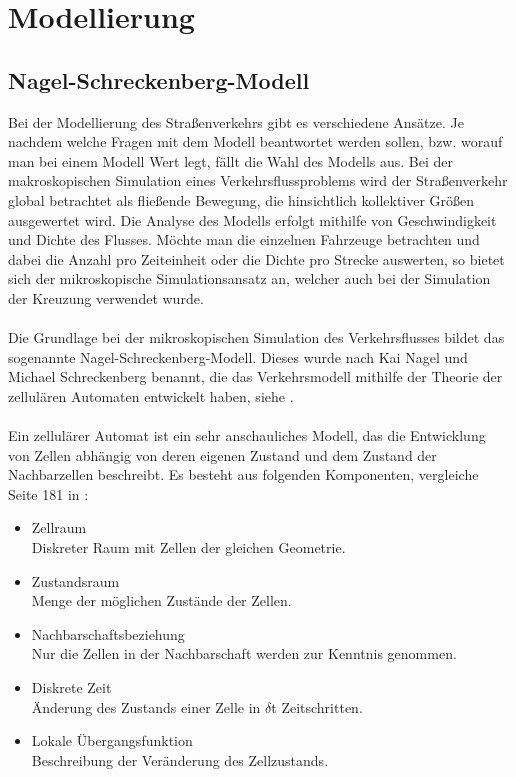 \chapter{Modellierung}\label{chap2}

\section{Nagel-Schreckenberg-Modell}
Bei der Modellierung des Straßenverkehrs gibt es verschiedene Ansätze. Je nachdem welche Fragen mit dem Modell beantwortet werden sollen, bzw. worauf man bei einem Modell Wert legt, fällt die Wahl des Modells aus. Bei der makroskopischen Simulation eines Verkehrsflussproblems wird der Straßenverkehr global betrachtet als fließende Bewegung, die hinsichtlich kollektiver Größen ausgewertet wird. Die Analyse des Modells erfolgt mithilfe von Geschwindigkeit und Dichte des Flusses. Möchte man die einzelnen Fahrzeuge betrachten und dabei die Anzahl pro Zeiteinheit oder die Dichte pro Strecke auswerten, so bietet sich der mikroskopische Simulationsansatz an, welcher auch bei der Simulation der Kreuzung verwendet wurde. \\
\\
Die Grundlage bei der mikroskopischen Simulation des Verkehrsflusses bildet das sogenannte Nagel-Schreckenberg-Modell. Dieses wurde nach Kai Nagel und Michael Schreckenberg benannt, die das Verkehrsmodell mithilfe der Theorie der zellulären Automaten entwickelt haben, siehe \cite{article:NaSch}. \\
\\
Ein zellulärer Automat ist ein sehr anschauliches Modell, das die Entwicklung von Zellen abhängig von deren eigenen Zustand und dem Zustand der Nachbarzellen beschreibt. Es besteht aus folgenden Komponenten, vergleiche Seite 181 in \cite{book:bungartz}: 
\begin{itemize}
 	  \item Zellraum\\
      		Diskreter Raum mit Zellen der gleichen Geometrie.
      \item Zustandsraum\\
      		Menge der möglichen Zustände der Zellen.
      \item Nachbarschaftsbeziehung\\
      		Nur die Zellen in der Nachbarschaft werden zur Kenntnis 				genommen.
      \item Diskrete Zeit \\
      		Änderung des Zustands einer Zelle in \( \delta \)t						Zeitschritten.
      \item Lokale Übergangsfunktion\\
      		Beschreibung der Veränderung des Zellzustands.
\end{itemize}

